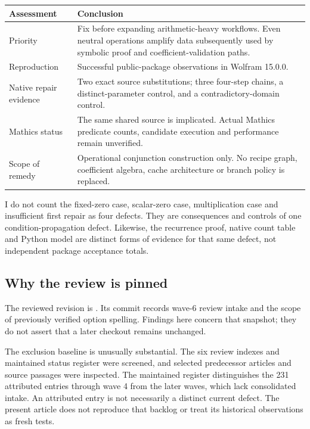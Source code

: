 \documentclass[11pt,a4paper]{article}
\begin{document}
\begin{center}
\begin{tabular}{@{}P{30mm}P{119mm}@{}}\toprule
Assessment & Conclusion\\\midrule
Priority & Fix before expanding arithmetic-heavy workflows. Even neutral operations amplify data subsequently used by symbolic proof and coefficient-validation paths.\\
Reproduction & Successful public-package observations in Wolfram 15.0.0.\\
Native repair evidence & Two exact source substitutions; three four-step chains, a distinct-parameter control, and a contradictory-domain control.\\
Mathics status & The same shared source is implicated. Actual Mathics predicate counts, candidate execution and performance remain unverified.\\
Scope of remedy & Operational conjunction construction only. No recipe graph, coefficient algebra, cache architecture or branch policy is replaced.\\\bottomrule
\end{tabular}
\end{center}

I do not count the fixed-zero case, scalar-zero case, multiplication case and insufficient first repair as four defects. They are consequences and controls of one condition-propagation defect. Likewise, the recurrence proof, native count table and Python model are distinct forms of evidence for that same defect, not independent package acceptance totals.

\subsection{Why the review is pinned}
The reviewed revision is . Its commit records wave-6 review intake and the scope of previously verified option spelling. Findings here concern that snapshot; they do not assert that a later checkout remains unchanged.\cite{snapshot}

The exclusion baseline is unusually substantial. The six review indexes and maintained status register were screened, and selected predecessor articles and source passages were inspected. The maintained register distinguishes the 231 attributed entries through wave 4 from the later waves, which lack consolidated intake. An attributed entry is not necessarily a distinct current defect. The present article does not reproduce that backlog or treat its historical observations as fresh tests.\cite{reviewindex,status,wave5,wave6}
\end{document}
